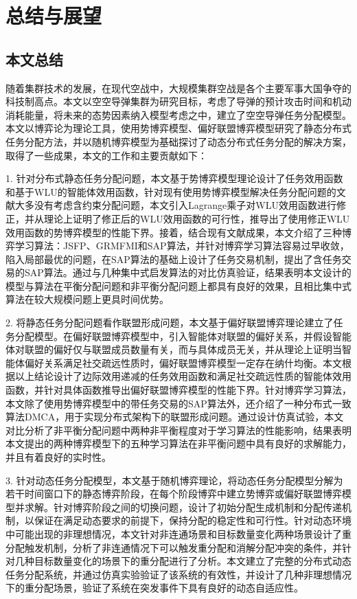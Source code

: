 
\chapter{总结与展望}
\label{summary}

\section{本文总结}

随着集群技术的发展，在现代空战中，大规模集群空战是各个主要军事大国争夺的科技制高点。本文以空空导弹集群为研究目标，考虑了导弹的预计攻击时间和机动消耗能量，将未来的态势因素纳入模型考虑之中，建立了空空导弹任务分配模型。本文以博弈论为理论工具，使用势博弈模型、偏好联盟博弈模型研究了静态分布式任务分配方法，并以随机博弈模型为基础探讨了动态分布式任务分配的解决方案，取得了一些成果，本文的工作和主要贡献如下：

1. 针对分布式静态任务分配问题，本文基于势博弈模型理论设计了任务效用函数和基于WLU的智能体效用函数，针对现有使用势博弈模型解决任务分配问题的文献大多没有考虑含约束分配问题，本文引入Lagrange乘子对WLU效用函数进行修正，并从理论上证明了修正后的WLU效用函数的可行性，推导出了使用修正WLU效用函数的势博弈模型的性能下界。接着，结合现有文献成果，本文介绍了三种博弈学习算法：JSFP、GRMFMI和SAP算法，并针对博弈学习算法容易过早收敛，陷入局部最优的问题，在SAP算法的基础上设计了任务交易机制，提出了含任务交易的SAP算法。通过与几种集中式启发算法的对比仿真验证，结果表明本文设计的模型与算法在平衡分配问题和非平衡分配问题上都具有良好的效果，且相比集中式算法在较大规模问题上更具时间优势。

2. 将静态任务分配问题看作联盟形成问题，本文基于偏好联盟博弈理论建立了任务分配模型。在偏好联盟博弈模型中，引入智能体对联盟的偏好关系，并假设智能体对联盟的偏好仅与联盟成员数量有关，而与具体成员无关，并从理论上证明当智能体偏好关系满足社交疏远性质时，偏好联盟博弈模型一定存在纳什均衡。本文根据以上结论设计了边际效用递减的任务效用函数和满足社交疏远性质的智能体效用函数，并针对具体函数推导出偏好联盟博弈模型的性能下界。针对博弈学习算法，本文除了使用势博弈模型中的带任务交易的SAP算法外，还介绍了一种分布式一致算法DMCA，用于实现分布式架构下的联盟形成问题。通过设计仿真试验，本文对比分析了非平衡分配问题中两种非平衡程度对于学习算法的性能影响，结果表明本文提出的两种博弈模型下的五种学习算法在非平衡问题中具有良好的求解能力，并且有着良好的实时性。

3. 针对动态任务分配模型，本文基于随机博弈理论，将动态任务分配模型分解为若干时间窗口下的静态博弈阶段，在每个阶段博弈中建立势博弈或偏好联盟博弈模型并求解。针对博弈阶段之间的切换问题，设计了初始分配生成机制和分配传递机制，以保证在满足动态要求的前提下，保持分配的稳定性和可行性。针对动态环境中可能出现的非理想情况，本文针对非连通场景和目标数量变化两种场景设计了重分配触发机制，分析了非连通情况下可以触发重分配和消解分配冲突的条件，并针对几种目标数量变化的场景下的重分配进行了分析。本文建立了完整的分布式动态任务分配系统，并通过仿真实验验证了该系统的有效性，并设计了几种非理想情况下的重分配场景，验证了系统在突发事件下具有良好的动态自适应性。

